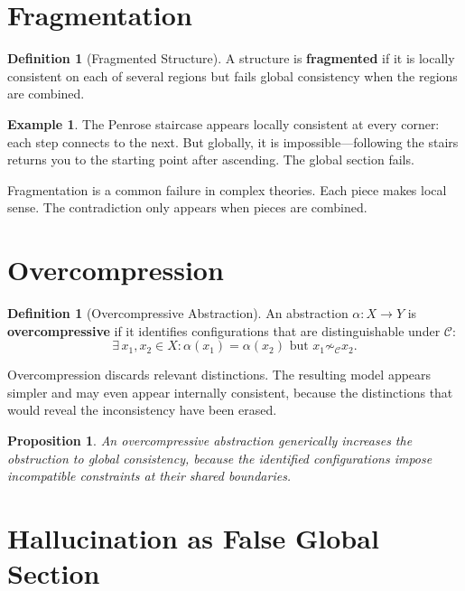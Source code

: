 \documentclass[11pt]{book}
\theoremstyle{plain}
\newtheorem{proposition}[theorem]{Proposition}
\theoremstyle{definition}
\newtheorem{definition}[theorem]{Definition}
\newtheorem{example}[theorem]{Example}
\theoremstyle{remark}
\newcommand{\C}{\mathcal{C}}
\begin{document}
\section{Fragmentation}

\begin{definition}[Fragmented Structure]
A structure is \textbf{fragmented} if it is locally consistent on each
of several regions but fails global consistency when the regions are
combined.
\end{definition}

\begin{example}
The Penrose staircase appears locally consistent at every corner: each step
connects to the next. But globally, it is impossible---following the stairs
returns you to the starting point after ascending. The global section fails.
\end{example}

Fragmentation is a common failure in complex theories. Each piece makes
local sense. The contradiction only appears when pieces are combined.

\section{Overcompression}

\begin{definition}[Overcompressive Abstraction]
An abstraction $\alpha : X \to Y$ is \textbf{overcompressive} if it
identifies configurations that are distinguishable under $\C$:
\[
  \exists\, x_1, x_2 \in X : \alpha(x_1) = \alpha(x_2)
  \text{ but } x_1 \not\sim_\C x_2.
\]
\end{definition}

Overcompression discards relevant distinctions. The resulting model appears
simpler and may even appear internally consistent, because the distinctions
that would reveal the inconsistency have been erased.

\begin{proposition}
An overcompressive abstraction generically increases the obstruction to
global consistency, because the identified configurations impose incompatible
constraints at their shared boundaries.
\end{proposition}

\section{Hallucination as False Global Section}
\end{document}
